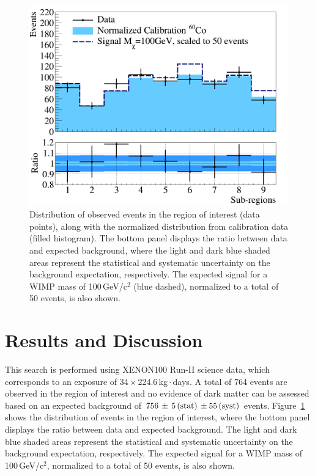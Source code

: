 \begin{figure}[t]
  \includegraphics[width=\linewidth]{images/data_vs_bkg.png}
  \caption{Distribution of  observed events  in the region of interest (data points), along with the normalized distribution from calibration data (filled histogram). The bottom panel displays the ratio
between data and expected background, where the light  and dark blue shaded areas represent the statistical and systematic uncertainty 
on the background expectation, respectively. The expected signal for a WIMP mass of 100\,GeV/c$^2$ (blue dashed), normalized to a total of 50 events, is also shown.}
  \label{fig:dataVSbkg}
\end{figure}


\section{Results and Discussion}
\label{sec:results}

This search is performed using XENON100 Run-II science data, which corresponds to an exposure of 34\,$\times$\,224.6\,kg\,$\cdot$\,days. 
A total of 764 events are observed in the region of interest and no evidence of dark matter can be assessed based on an expected background of
$756 \, \pm \, 5 \,{\rm (stat)} \, \pm 55\, {\rm (syst)}$ events. 
Figure~\ref{fig:dataVSbkg} shows the distribution of  events  in the region of interest, where the bottom panel displays the ratio
between data and expected background. The light and dark blue shaded areas represent the statistical and systematic uncertainty 
on the background expectation, respectively. The expected signal for a WIMP mass of 100\,GeV/c$^2$, normalized to a total of 50 events, is also shown.



